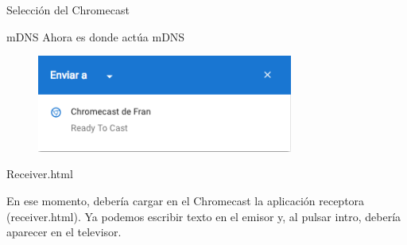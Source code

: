 \begin{frame}{Selección del Chromecast}
	\begin{block}{mDNS}
		Ahora es donde actúa mDNS
	\end{block}
	\vspace{0.5cm}
	\begin{figure}[H]
		\centering
		\includegraphics[width=0.75\textwidth]{./Imagenes/seleccion.png}
	\end{figure}
\end{frame}



\begin{frame}{Receiver.html}
	\begin{block}{ }
		En ese momento, debería cargar en el Chromecast la aplicación receptora (receiver.html).
		Ya podemos escribir texto en el emisor y, al pulsar intro, debería aparecer en el televisor.
	\end{block}
\end{frame}



